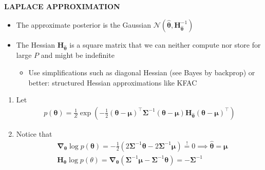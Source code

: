 \begin{whitebox}{\textbf{LAPLACE APPROXIMATION}}
\begin{itemize}
\begin{itemize}
\begin{itemize}
                \item The approximate posterior is the Gaussian $\mathcal{N}(\hat{\bm{\theta}},\bm{H}_{\hat{\bm{\theta}}}^{-1})$
                \item The Hessian $\bm{H}_{\hat{\bm{\theta}}}$ is a square matrix that we can neither compute nor store for large $P$ and might be indefinite
                \begin{itemize}
                    \item Use simplifications such as diagonal Hessian (see Bayes by backprop) or better: structured Hessian approximations like KFAC
                \end{itemize}
            \end{itemize}
            \begin{enumerate}
                \item Let
                \begin{align*}
                    p(\bm{\theta})=\frac{1}{Z}\exp\left(-\frac{1}{2}(\bm{\theta}-\bm{\mu})^\top\bm{\Sigma}^{-1}(\bm{\theta}-\bm{\mu})\bm{H}_{\hat{\bm{\theta}}}(\bm{\theta}-\bm{\mu})^\top\right)
                \end{align*}
                \item Notice that
                \begin{align*}
                    &\bm{\nabla}_{\bm{\theta}}\log p(\bm{\theta})=-\frac{1}{2}(2\bm{\Sigma}^{-1}\bm{\theta}-2\bm{\Sigma}^{-1}\bm{\mu})\overset{!}{=}0\implies\hat{\bm{\theta}}=\bm{\mu}\\
                    &\bm{H}_{\bm{\theta}}\log p(\theta)=\bm{\nabla}_{\bm{\theta}}(\bm{\Sigma}^{-1}\bm{\mu}-\bm{\Sigma}^{-1}\bm{\theta})=-\bm{\Sigma}^{-1}
                \end{align*}
            \end{enumerate}
        \end{itemize}
    \end{itemize}
\end{whitebox}

